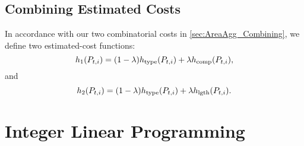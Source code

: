 \subsection{Combining Estimated Costs}
\label{sec:AreaAgg_CombinationEstimated}
In accordance 
with our two combinatorial costs in 
\sect\ref{sec:AreaAgg_Combining},
we define two estimated-cost functions:
\begin{equation}
\label{eq:h_1}
h_1(P_{t,i})=
(1-\lambda)h_\mathrm{type}(P_{t,i})
+\lambda h_{\mathrm{comp}}(P_{t,i}),
\end{equation}
and
\begin{equation}
\label{eq:h_2}
h_2(P_{t,i})=
(1-\lambda)h_\mathrm{type}(P_{t,i})
+\lambda h_{\mathrm{lgth}}(P_{t,i}).
\end{equation}



\section{Integer Linear Programming}
\label{sec:AreaAgg_ILP}


